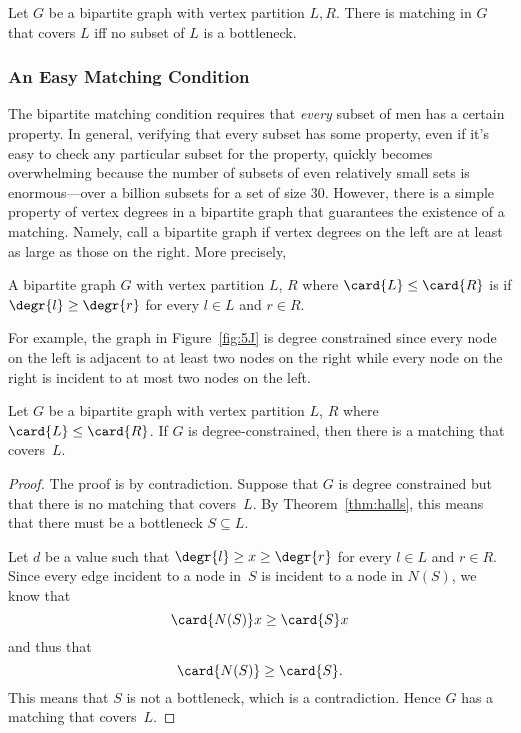 \begin{theorem}\label{thm:halls}
  Let $G$ be a bipartite graph with vertex partition $L,R$.  There is matching in $G$
  that covers $L$ iff no subset of $L$ is a bottleneck.
\end{theorem}

\subsubsection{An Easy Matching Condition}

The bipartite matching condition requires that \emph{every} subset of
men has a certain property.  In general, verifying that every subset
has some property, even if it's easy to check any particular subset
for the property, quickly becomes overwhelming because the number of
subsets of even relatively small sets is enormous---over a billion
subsets for a set of size 30.  However, there is a simple property of
vertex degrees in a bipartite graph that guarantees the existence of a
matching.  Namely, call a bipartite graph 
if vertex degrees on the left are at least as large as those on the
right.  More precisely,

\begin{definition}\label{degree-constrained_def}
A bipartite graph $G$ with vertex partition $L$, $R$ where $\card{L}
\le \card{R}$ is  if $\degr{l} \geq \degr{r}$
for every $l \in L$ and $r \in R$.
\end{definition}

For example, the graph in Figure~\ref{fig:5J} is degree constrained
since every node on the left is adjacent to at least two nodes on the
right while every node on the right is incident to at most two nodes
on the left.

\begin{theorem}\label{lem:no-bottleneck}
Let $G$ be a bipartite graph with vertex partition $L$, $R$ where
$\card{L} \le \card{R}$.  If $G$ is degree-constrained, then there is
a matching that covers~$L$.
\end{theorem}

\begin{proof}
The proof is by contradiction.  Suppose that $G$ is degree constrained
but that there is no matching that covers~$L$.  By
Theorem~\ref{thm:halls}, this means that there must be a bottleneck $S
\subseteq L$.

Let $d$ be a value such that $\degr{l} \ge x \ge \degr{r}$ for every
$l \in L$ and $r \in R$.  Since every edge incident to a node in~$S$
is incident to a node in $N(S)$, we know that
\begin{equation*}
    \card{N(S)} x \ge \card{S} x
\end{equation*}
and thus that
\begin{equation*}
    \card{N(S)} \ge \card{S}.
\end{equation*}
This means that $S$ is not a bottleneck, which is a contradiction.
Hence $G$ has a matching that covers~$L$.
\end{proof}

